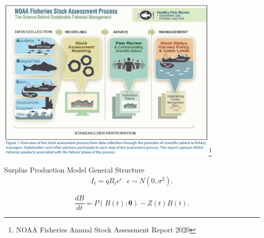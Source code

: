 \documentclass[ xcolor = pdftex, dvipsnames, table ]{beamer}
\begin{document}
%
\begin{frame}
	\centering
	\includegraphics[width=0.8\textwidth]{saCycle.png}\footnote{NOAA Fisheries Annual Stock Assessment Report 2020}
\end{frame}



%
\begin{frame}{Surplus Production Model General Structure} 
        \begin{align*}
	I_t = q B_t e^\epsilon ~~~ \epsilon\sim N(0, \sigma^2). \label{resp}
	\end{align*}
	
	\begin{equation*}
	\frac{dB}{dt} = P(B(t); \bm{\theta}) - Z(t)B(t). \label{ode}
	\end{equation*}
\end{frame}
\end{document}
